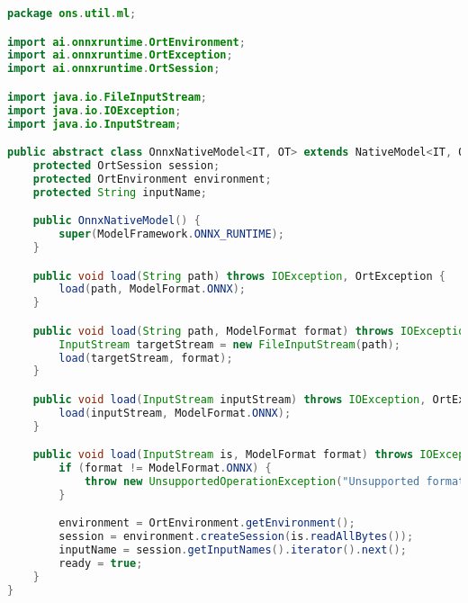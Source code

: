 \begin{lstlisting}[language=Java, caption=Implementação da classe OnnxNativeModel, label={lst:onnx-native-model}]
package ons.util.ml;

import ai.onnxruntime.OrtEnvironment;
import ai.onnxruntime.OrtException;
import ai.onnxruntime.OrtSession;

import java.io.FileInputStream;
import java.io.IOException;
import java.io.InputStream;

public abstract class OnnxNativeModel<IT, OT> extends NativeModel<IT, OT> {
    protected OrtSession session;
    protected OrtEnvironment environment;
    protected String inputName;

    public OnnxNativeModel() {
        super(ModelFramework.ONNX_RUNTIME);
    }

    public void load(String path) throws IOException, OrtException {
        load(path, ModelFormat.ONNX);
    }

    public void load(String path, ModelFormat format) throws IOException, OrtException {
        InputStream targetStream = new FileInputStream(path);
        load(targetStream, format);
    }

    public void load(InputStream inputStream) throws IOException, OrtException {
        load(inputStream, ModelFormat.ONNX);
    }

    public void load(InputStream is, ModelFormat format) throws IOException, OrtException {
        if (format != ModelFormat.ONNX) {
            throw new UnsupportedOperationException("Unsupported format");
        }

        environment = OrtEnvironment.getEnvironment();
        session = environment.createSession(is.readAllBytes());
        inputName = session.getInputNames().iterator().next();
        ready = true;
    }
}
\end{lstlisting}

